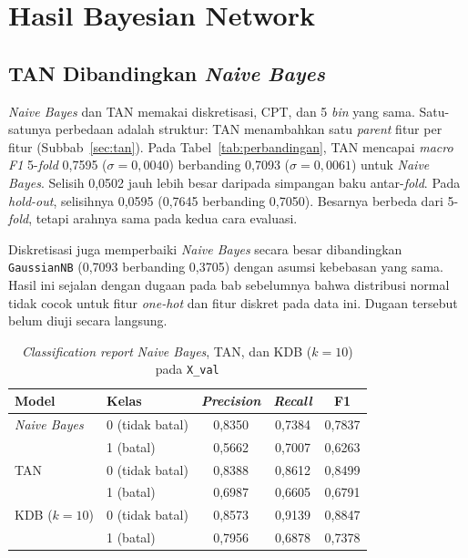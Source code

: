 \section{Hasil Bayesian Network}
\label{sec:hasil-bn}

\subsection{TAN Dibandingkan \textit{Naive Bayes}}

\textit{Naive Bayes} dan TAN memakai diskretisasi, CPT, dan 5 \textit{bin} yang
sama. Satu-satunya perbedaan adalah struktur: TAN menambahkan satu
\textit{parent} fitur per fitur (Subbab~\ref{sec:tan}). Pada Tabel~\ref{tab:perbandingan},
TAN mencapai \textit{macro F1} 5-\textit{fold} 0,7595 ($\sigma=0{,}0040$)
berbanding 0,7093 ($\sigma=0{,}0061$) untuk \textit{Naive Bayes}. Selisih 0,0502
jauh lebih besar daripada simpangan baku antar-\textit{fold}. Pada \textit{hold-out},
selisihnya 0,0595 (0,7645 berbanding 0,7050). Besarnya berbeda dari 5-\textit{fold},
tetapi arahnya sama pada kedua cara evaluasi.

Diskretisasi juga memperbaiki \textit{Naive Bayes} secara besar dibandingkan
\texttt{GaussianNB} (0,7093 berbanding 0,3705) dengan asumsi kebebasan yang sama.
Hasil ini sejalan dengan dugaan pada bab sebelumnya bahwa distribusi normal tidak
cocok untuk fitur \textit{one-hot} dan fitur diskret pada data ini. Dugaan
tersebut belum diuji secara langsung.

\begin{table}[H]
	\centering
	\caption{\textit{Classification report} \textit{Naive Bayes}, TAN, dan KDB ($k=10$) pada \texttt{X\_val}}
	\label{tab:report-bn}
	\begin{tabular}{l l c c c}
		\toprule
		\textbf{Model} & \textbf{Kelas} & \textbf{\textit{Precision}} & \textbf{\textit{Recall}} & \textbf{F1} \\
		\midrule
		\textit{Naive Bayes} & 0 (tidak batal) & 0,8350 & 0,7384 & 0,7837 \\
		                     & 1 (batal)       & 0,5662 & 0,7007 & 0,6263 \\
		\midrule
		TAN                  & 0 (tidak batal) & 0,8388 & 0,8612 & 0,8499 \\
		                     & 1 (batal)       & 0,6987 & 0,6605 & 0,6791 \\
		\midrule
		KDB ($k=10$)         & 0 (tidak batal) & 0,8573 & 0,9139 & 0,8847 \\
		                     & 1 (batal)       & 0,7956 & 0,6878 & 0,7378 \\
		\bottomrule
	\end{tabular}
\end{table}

